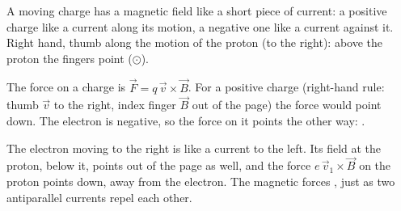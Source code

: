 \begin{abcliste}
\abc A moving charge has a magnetic field like a short piece of current: a positive charge like a current along its motion, a negative one like a current against it. Right hand, thumb along the motion of the proton (to the right): above the proton the fingers point  ($\odot$).

\abc The force on a charge is $\vec F = q\,\vec v\times\vec B$. For a positive charge (right-hand rule: thumb $\vec v$ to the right, index finger $\vec B$ out of the page) the force would point down. The electron is negative, so the force on it points the other way: .

\abc The electron moving to the right is like a current to the left. Its field at the proton, below it, points out of the page as well, and the force $e\,\vec v_1\times\vec B$ on the proton points down, away from the electron. The magnetic forces , just as two antiparallel currents repel each other.
\end{abcliste}
